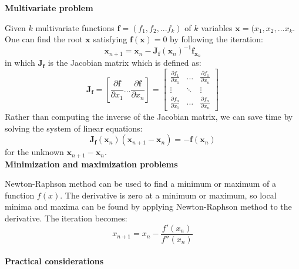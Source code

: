  
\textbf{Multivariate problem}

Given $k$ multivariate functions $\mathbf{f} = (f_1, f_2,... f_k)$ of $k$ variables $\mathbf{x} = (x_1, x_2,... x_k$. One can find the root $\mathbf{x}$ satisfying $\mathbf{f(x)} = 0$ by following the iteration:
\begin{equation}
	\mathbf{x}_{n+1} = \mathbf{x}_{n} - \mathbf{J}_{\mathbf{f}} (\mathbf{x}_n)^{-1} \mathbf{f}_{\mathbf{x}_n}
\end{equation}
in which $\mathbf{J}_{\mathbf{f}}$ is the Jacobian matrix which is defined as:
\begin{equation}
	\mathbf{J}_{\mathbf{f}} = \left[ \frac{\partial \mathbf{f}}{\partial x_1} \dots \frac{\partial \mathbf{f}}{\partial x_n} \right] =
	\begin{bmatrix}
		\frac{\partial f_1}{\partial x_1} & \dots & \frac{\partial f_1}{\partial x_n} \\
		\vdots & \ddots & \vdots \\
		\frac{\partial f_n}{\partial x_1} & \dots & \frac{\partial f_n}{\partial x_n}		
	\end{bmatrix}
\end{equation}
Rather than computing the inverse of the Jacobian matrix, we can save time by solving the system of linear equations:
\begin{equation}
	\mathbf{J}_{\mathbf{f}} (\mathbf{x}_n) \left( \mathbf{x}_{n+1} - \mathbf{x}_n \right) = -\mathbf{f} (\mathbf{x}_n)
\end{equation}
for the unknown $\mathbf{x}_{n+1} - \mathbf{x}_n$.
\\


\textbf{Minimization and maximization problems}

Newton-Raphson method can be used to find a minimum or maximum of a function $f(x)$. The derivative is zero at a minimum or maximum, so local minima and maxima can be found by applying Newton-Raphson method to the derivative. The iteration becomes:
\begin{equation}
	x_{n+1} = x_n - \frac{f'(x_n)}{f''(x_n)}
\end{equation}
\\


\textbf{Practical considerations}

